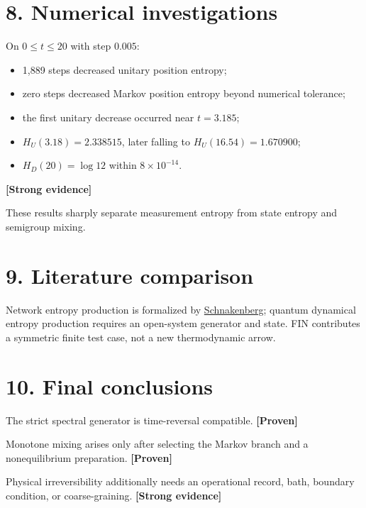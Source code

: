 \documentclass[11pt,a4paper,openany]{report}
\newcommand{\statusProven}{\textcolor{fingreen}{[Proven]}}
\newcommand{\statusStrong}{\textcolor{finblue}{[Strong evidence]}}
\begin{document}
\section{8. Numerical investigations}

On \(0\le t\le20\) with step \(0.005\):

\begin{itemize}
\item 
1,889 steps decreased unitary position entropy;

\item 
zero steps decreased Markov position entropy beyond numerical tolerance;

\item 
the first unitary decrease occurred near \(t=3.185\);

\item 
\(H_U(3.18)=2.338515\), later falling to \(H_U(16.54)=1.670900\);

\item 
\(H_D(20)=\log12\) within \(8\times10^{-14}\).

\end{itemize}

\textbf{\statusStrong{}}

These results sharply separate measurement entropy from state entropy and semigroup mixing.

\section{9. Literature comparison}

Network entropy production is formalized by \href{https://doi.org/10.1103/RevModPhys.48.571}{Schnakenberg}; quantum dynamical entropy production requires an open-system generator and state. FIN contributes a symmetric finite test case, not a new thermodynamic arrow.

\section{10. Final conclusions}

The strict spectral generator is time-reversal compatible. \textbf{\statusProven{}}

Monotone mixing arises only after selecting the Markov branch and a nonequilibrium preparation. \textbf{\statusProven{}}

Physical irreversibility additionally needs an operational record, bath, boundary condition, or coarse-graining. \textbf{\statusStrong{}}
\end{document}
